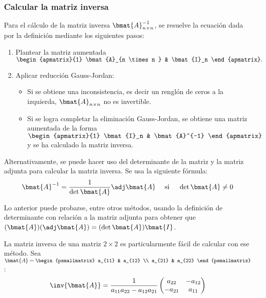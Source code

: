 \documentclass{fmbnotes}
\begin{document}
\subsubsection{Calcular la matriz inversa}
Para el cálculo de la matriz inversa \(\bmat{A}_{n \times n}^{-1}\), se resuelve la ecuación dada por la definición mediante los siguientes pasos:
\begin{enumerate}
\item Plantear la matriz aumentada \(\begin{apmatrix}{1}
\bmat{A}_{n \times n } & \bmat{I}_n
\end{apmatrix}.\)
\item Aplicar reducción Gauss-Jordan:
\begin{itemize}
\item Si se obtiene una inconsistencia, es decir un renglón de ceros a la izquierda, \( \bmat{A}_{n \times n } \) no es invertible.
\item Si se logra completar la eliminación Gauss-Jordan, se obtiene una matriz aumentada de la forma \(\begin{apmatrix}{1}
 \bmat{I}_n & \bmat{A}^{-1}
\end{apmatrix}\) y se ha calculado la matriz inversa.
\end{itemize}
\end{enumerate}

Alternativamente, se puede hacer uso del determinante de la matriz y la matriz adjunta para calcular la matriz inversa. Se usa la siguiente fórmula:
\[\bmat{A}^{-1}=\frac{1}{\det \bmat{A}}\adj \bmat{A} \quad \text{ si } \quad \det \bmat{A} \neq 0\]

Lo anterior puede probarse, entre otros métodos, usando la definición de determinante con relación a la matriz adjunta para obtener que \((\bmat{A})(\adj \bmat{A})=(\det \bmat{A})\bmat{I}\).

\begin{tip}
La matriz inversa de una matriz \(2 \times 2\) es particularmente fácil de calcular con ese método. Sea \(\bmat{A}=\begin{psmallmatrix}
a_{11} & a_{12} \\ a_{21} & a_{22}
\end{psmallmatrix}\):
\[ \inv{\bmat{A}}=\frac{1}{a_{11}a_{22}-a_{12}a_{21}}\begin{pmatrix}
a_{22} & -a_{12} \\ -a_{21} & a_{11}
\end{pmatrix}\]
\end{tip}
\end{document}
